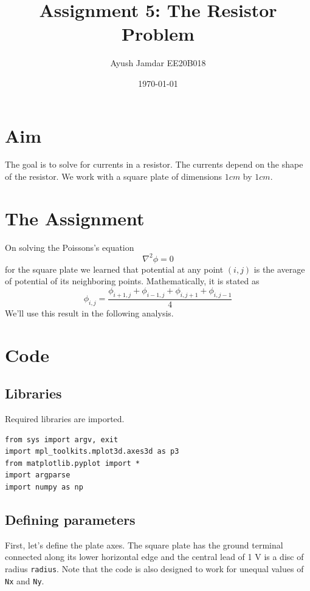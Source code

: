 \documentclass[11pt, a4paper]{article}
\title{Assignment 5: The Resistor Problem} %
\author{Ayush Jamdar EE20B018} %
\date{\today} %
\begin{document}
		
		
\maketitle %
\section{Aim}
The goal is to solve for currents in a resistor. The currents depend on the shape of the resistor.
We work with a square plate of dimensions $1 cm$ by $1 cm$. 


\section{The Assignment}
On solving the Poissons's equation 
$$\nabla ^2\phi = 0$$
for the square plate we learned that potential at any point $(i, j)$ is the average of potential of its neighboring points.
Mathematically, it is stated as 
$$\phi_{i,j} = \frac{\phi_{i+1,j}+\phi_{i-1,j}+\phi_{i,j+1}+\phi_{i,j-1}}{4}$$
We'll use this result in the following analysis.

\section{Code}
\subsection{Libraries}
Required libraries are imported. 
\begin{verbatim}
from sys import argv, exit
import mpl_toolkits.mplot3d.axes3d as p3
from matplotlib.pyplot import *
import argparse
import numpy as np
\end{verbatim}

\subsection{Defining parameters}
First, let's define the plate axes. The square plate has the ground terminal connected along its lower horizontal edge and the central lead of 1 V is a disc of radius \texttt{radius}. Note that the code is also designed to work for unequal values of \texttt{Nx} and \texttt{Ny}. 
\end{document}
